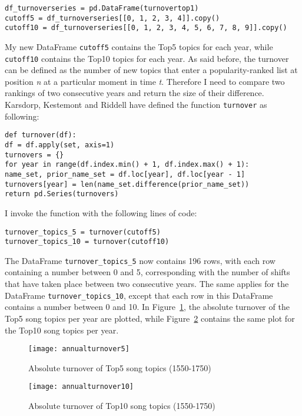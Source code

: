 \begin{lstlisting}
df_turnoverseries = pd.DataFrame(turnovertop1)
cutoff5 = df_turnoverseries[[0, 1, 2, 3, 4]].copy()
cutoff10 = df_turnoverseries[[0, 1, 2, 3, 4, 5, 6, 7, 8, 9]].copy()
\end{lstlisting}

\noindent My new DataFrame \texttt{cutoff5} contains the Top5 topics for each year, while \texttt{cutoff10} contains the Top10 topics for each year. As said before, the turnover can be defined as the number of new topics that enter a popularity-ranked list at position \textit{n} at a particular moment in time \textit{t}. Therefore I need to compare two rankings of two consecutive years and return the size of their difference. Karsdorp, Kestemont and Riddell have defined the function \texttt{turnover} as following:\autocite[134]{karsdorp_humanities_2019}

\begin{lstlisting}
def turnover(df):
df = df.apply(set, axis=1)
turnovers = {}
for year in range(df.index.min() + 1, df.index.max() + 1):
name_set, prior_name_set = df.loc[year], df.loc[year - 1]
turnovers[year] = len(name_set.difference(prior_name_set))
return pd.Series(turnovers)
\end{lstlisting}

\noindent I invoke the function with the following lines of code:

\begin{lstlisting}
turnover_topics_5 = turnover(cutoff5)
turnover_topics_10 = turnover(cutoff10)
\end{lstlisting}

\noindent The DataFrame \texttt{turnover\_topics\_5} now contains 196 rows, with each row containing a number between 0 and 5, corresponding with the number of shifts that have taken place between two consecutive years. The same applies for the DataFrame \texttt{turnover\_topics\_10}, except that each row in this DataFrame contains a number between 0 and 10. In Figure~\ref{fig:annualturnover5}, the absolute turnover of the Top5 song topics per year are plotted, while Figure~\ref{fig:annualturnover10} contains the same plot for the Top10 song topics per year.

\begin{figure}[hbt!]
	\centering
	\texttt{[image: annualturnover5]}
	\caption{Absolute turnover of Top5 song topics (1550-1750)}
	\label{fig:annualturnover5}
\end{figure}

\begin{figure}[hbt!]
	\centering
	\texttt{[image: annualturnover10]}
	\caption{Absolute turnover of Top10 song topics (1550-1750)}
	\label{fig:annualturnover10}
\end{figure}

